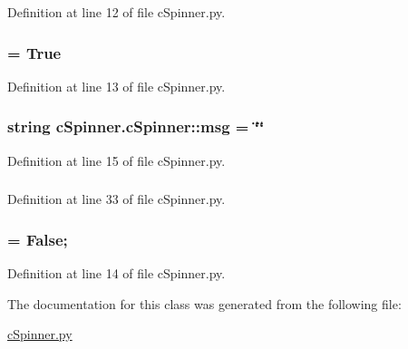 \-Definition at line 12 of file c\-Spinner.\-py.

\hypertarget{classcSpinner_1_1cSpinner_a8804996158a1e7e26c5947a927b5bee7}{
\subsubsection[{keeprunning}]{ = \-True}}\label{classcSpinner_1_1cSpinner_a8804996158a1e7e26c5947a927b5bee7}


\-Definition at line 13 of file c\-Spinner.\-py.

\hypertarget{classcSpinner_1_1cSpinner_a453929c31466debd4a3b5848b16e3082}{
\subsubsection[{msg}]{\setlength{\rightskip}{0pt plus 5cm}string {\bf c\-Spinner.\-c\-Spinner\-::msg} = \char`\"{}\char`\"{}}}\label{classcSpinner_1_1cSpinner_a453929c31466debd4a3b5848b16e3082}


\-Definition at line 15 of file c\-Spinner.\-py.

\hypertarget{classcSpinner_1_1cSpinner_a58b879cfb514915a371d25fbf031210b}{
\subsubsection[{msg}]{}}\label{classcSpinner_1_1cSpinner_a58b879cfb514915a371d25fbf031210b}


\-Definition at line 33 of file c\-Spinner.\-py.

\hypertarget{classcSpinner_1_1cSpinner_ab34ce9a9b313f2fda4225e81fd1c8f56}{
\subsubsection[{paused}]{ = \-False;}}\label{classcSpinner_1_1cSpinner_ab34ce9a9b313f2fda4225e81fd1c8f56}


\-Definition at line 14 of file c\-Spinner.\-py.



\-The documentation for this class was generated from the following file\-:\begin{DoxyCompactItemize}
\item 
\hyperlink{cSpinner_8py}{c\-Spinner.\-py}\end{DoxyCompactItemize}
